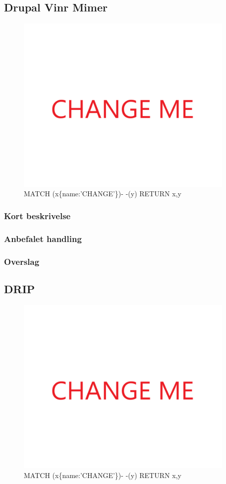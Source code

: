 \documentclass{article}
\begin{document}
\subsection{Drupal Vinr Mimer}
\begin{figure}[h]
\includegraphics[width=300pt]{CHANGE.PNG}
\caption{MATCH (x\{name:'CHANGE'\})- -(y) RETURN x,y}
\end{figure}
\subsubsection{Kort beskrivelse}
\subsubsection{Anbefalet handling}
\subsubsection{Overslag}
\subsection{DRIP}
\begin{figure}[h]
\includegraphics[width=300pt]{CHANGE.PNG}
\caption{MATCH (x\{name:'CHANGE'\})- -(y) RETURN x,y}
\end{figure}
\end{document}
